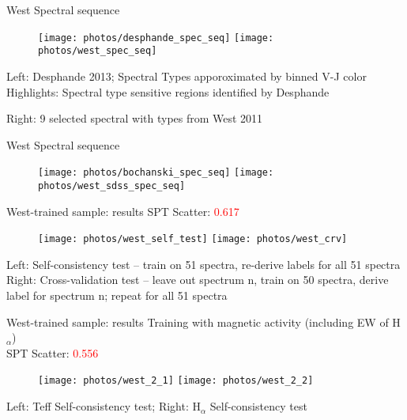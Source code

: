 \documentclass[compress]{beamer}
\begin{document}
\begin{frame}{West Spectral sequence}
\begin{figure}
	\texttt{[image: photos/desphande\_spec\_seq]} 
	\texttt{[image: photos/west\_spec\_seq]} 
\end{figure}
\small
\textcolor{sthlmDarkGreen}{Left}: Desphande 2013; Spectral Types apporoximated by binned V-J color
\hangindent=7.8mm Highlights: Spectral type sensitive regions identified by Desphande

\textcolor{sthlmDarkGreen}{Right}: 9 selected spectral with types from West 2011
\end{frame}


\begin{frame}{West Spectral sequence}
\begin{figure}
	\texttt{[image: photos/bochanski\_spec\_seq]} 
	\texttt{[image: photos/west\_sdss\_spec\_seq]} 
\end{figure}
\end{frame}


\begin{frame}{West-trained sample: results}
\small \textcolor{sthlmDarkGreen}{SPT Scatter:} \textcolor{red}{0.617}
\begin{figure}
	\texttt{[image: photos/west\_self\_test]} 
	\texttt{[image: photos/west\_crv]} 
\end{figure}
\small \textcolor{sthlmDarkGreen}{Left}: Self-consistency test 
\footnotesize
\hangindent=15mm -- train on 51 spectra, re-derive labels for all 51 spectra \\
\small
\textcolor{sthlmDarkGreen}{Right}: Cross-validation test
\footnotesize
\hangindent=15mm -- leave out spectrum n, train on 50 spectra, derive label for spectrum n; repeat for all 51 spectra \\
\end{frame}


\begin{frame}{West-trained sample: results}
Training with magnetic activity (including EW of H$_{\alpha}$) \\
\small \textcolor{sthlmDarkGreen}{SPT Scatter:} \textcolor{red}{0.556}
\begin{figure}
	\texttt{[image: photos/west\_2\_1]} 
	\texttt{[image: photos/west\_2\_2]} 
\end{figure}
\small \textcolor{sthlmDarkGreen}{Left}: Teff Self-consistency test; \textcolor{sthlmDarkGreen}{Right}: H$_{\alpha}$ Self-consistency test
\end{frame}
\end{document}
